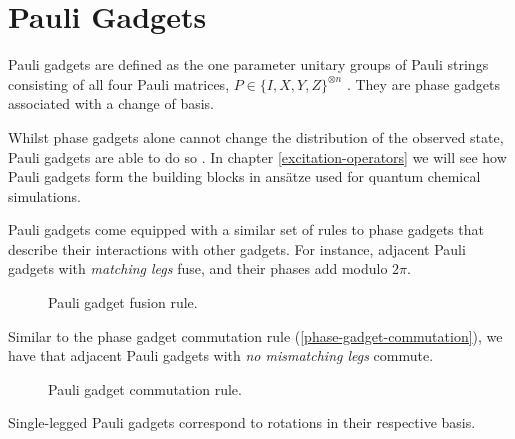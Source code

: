 \section{Pauli Gadgets}

Pauli gadgets are defined as the one parameter unitary groups of Pauli strings consisting of all four Pauli matrices, $P \in \{I, X, Y, Z\}^{\otimes n}$ \cite{Yeung2020}. They are phase gadgets associated with a change of basis.


Whilst phase gadgets alone cannot change the distribution of the observed state, Pauli gadgets are able to do so \cite{Yeung2020}. In chapter \ref{excitation-operators} we will see how Pauli gadgets form the building blocks in ansätze used for quantum chemical simulations.

Pauli gadgets come equipped with a similar set of rules to phase gadgets that describe their interactions with other gadgets. For instance, adjacent Pauli gadgets with \textit{matching legs} fuse, and their phases add modulo $2\pi$.

\begin{figure}[H]
    \centering
    \caption{Pauli gadget fusion rule.}
    \label{pauli-gadget-fusion}
\end{figure}

Similar to the phase gadget commutation rule (\ref{phase-gadget-commutation}), we have that adjacent Pauli gadgets with \textit{no mismatching legs} commute.

\begin{figure}[H]
    \centering
    \caption{Pauli gadget commutation rule.}
    \label{pauli-gadget-commutation}
\end{figure}

Single-legged Pauli gadgets correspond to rotations in their respective basis.

\vspace{5pt}

